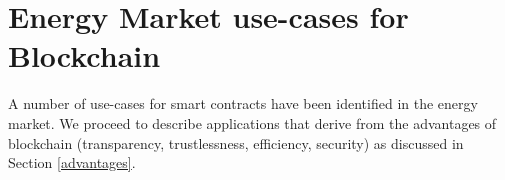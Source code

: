 
 
\section{Energy Market use-cases for Blockchain}

A number of use-cases for smart contracts have been identified in the energy market. We proceed to describe applications that derive from the advantages of blockchain (transparency, trustlessness, efficiency, security) as discussed in Section \ref{advantages}.

